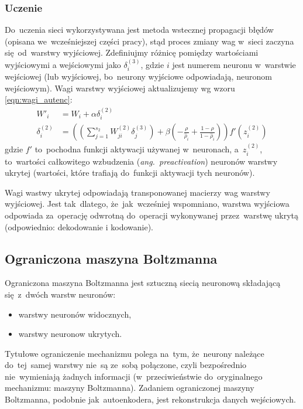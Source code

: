 \subsubsection{Uczenie}
Do~uczenia sieci wykorzystywana jest metoda wstecznej propagacji błędów (opisana we~wcześniejszej części pracy),
stąd proces zmiany wag w~sieci zaczyna się~od~warstwy wyjściowej. Zdefiniujmy różnicę pomiędzy wartościami wyjściowymi
a wejściowymi jako $\delta_i^{(3)}$, gdzie $i$ jest numerem neuronu w~warstwie wejściowej (lub wyjściowej, bo~neurony
wyjściowe odpowiadają, neuronom wejściowym).
Wagi warstwy wyjściowej aktualizujemy wg wzoru \ref{eqn:wagi_autenc}:
\begin{equation}
    \begin{split}
    W'_i &= W_i + \alpha\delta^{(2)}_i \\
    \delta_i^{(2)} &= \left( \left( \sum\limits_{j=1}^{s_{2}} W^{(2)}_{ji} \delta^{(3)}_j \right)
    + \beta \left( - \frac{\rho}{\hat\rho_i} + \frac{1-\rho}{1-\hat\rho_i} \right) \right) f'(z^{(2)}_i)
    \end{split}
    \label{eqn:wagi_autenc}
\end{equation}
gdzie $f'$ to~pochodna funkcji aktywacji używanej w~neuronach, a~$z^{(2)}_i$, to~wartości całkowitego wzbudzenia
(\textit{ang.~preactivation}) neuronów warstwy ukrytej (wartości, które trafiają do~funkcji aktywacji tych neuronów).

Wagi wastwy ukrytej odpowiadają transponowanej macierzy wag warstwy wyjściowej. Jest tak~dlatego, że~jak~wcześniej
wspomniano, warstwa wyjściowa odpowiada za~operację odwrotną do~operacji wykonywanej przez~warstwę ukrytą (odpowiednio:
dekodowanie i kodowanie).

\subsection{Ograniczona maszyna Boltzmanna}
Ograniczona maszyna Boltzmanna jest sztuczną siecią neuronową składającą się~z~dwóch warstw neuronów:
\begin{itemize}
  \item warstwy neuronów widocznych,
  \item warstwy neuronow ukrytych.
\end{itemize}

Tytułowe ograniczenie mechanizmu polega na~tym, że~neurony należące do~tej~samej warstwy nie~są ze~sobą połączone,
czyli bezpośrednio nie~wymieniają żadnych informacji (w~przeciwieństwie do~oryginalnego mechanizmu: maszyny Boltzmanna).
Zadaniem ograniczonej maszyny Boltzmanna, podobnie jak~autoenkodera, jest rekonstrukcja danych wejściowych.

